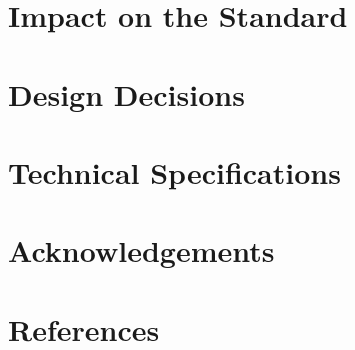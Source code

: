 \documentclass[
  format=manuscript,
  screen=true,
  review=false,
  nonacm=true,
  timestamp=true,
  balance=false]{acmart}
\begin{document}
\section{Impact on the Standard}

\section{Design Decisions}

\section{Technical Specifications}

\section{Acknowledgements}

\section{References}




\end{document}
